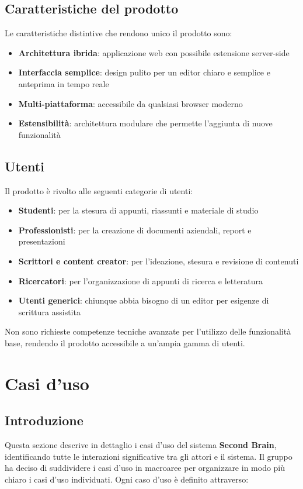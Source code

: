 \documentclass[11pt,a4paper]{article}
\begin{document}
\subsection{Caratteristiche del prodotto}
Le caratteristiche distintive che rendono unico il prodotto sono:

\begin{itemize}
    \item \textbf{Architettura ibrida}: applicazione web con possibile estensione server-side
    \item \textbf{Interfaccia semplice}: design pulito per un editor chiaro e semplice e anteprima in tempo reale
    \item \textbf{Multi-piattaforma}: accessibile da qualsiasi browser moderno
    \item \textbf{Estensibilità}: architettura modulare che permette l'aggiunta di nuove funzionalità
    
\end{itemize}

\subsection{Utenti}
Il prodotto è rivolto alle seguenti categorie di utenti:

\begin{itemize}
    \item \textbf{Studenti}: per la stesura di appunti, riassunti e materiale di studio
    \item \textbf{Professionisti}: per la creazione di documenti aziendali, report e presentazioni
    \item \textbf{Scrittori e content creator}: per l'ideazione, stesura e revisione di contenuti
    \item \textbf{Ricercatori}: per l'organizzazione di appunti di ricerca e letteratura
    \item \textbf{Utenti generici}: chiunque abbia bisogno di un editor per esigenze di scrittura assistita
\end{itemize}

Non sono richieste competenze tecniche avanzate per l'utilizzo delle funzionalità base, rendendo il prodotto accessibile a un'ampia gamma di utenti.

\newpage

\section{Casi d'uso}
\subsection{Introduzione}
Questa sezione descrive in dettaglio i casi d'uso del sistema \textbf{Second Brain}, identificando tutte le interazioni significative tra gli attori e il sistema. Il gruppo ha deciso di suddividere i casi d'uso in macroaree per organizzare in modo più chiaro i casi d'uso individuati. Ogni caso d'uso è definito attraverso:
\end{document}
